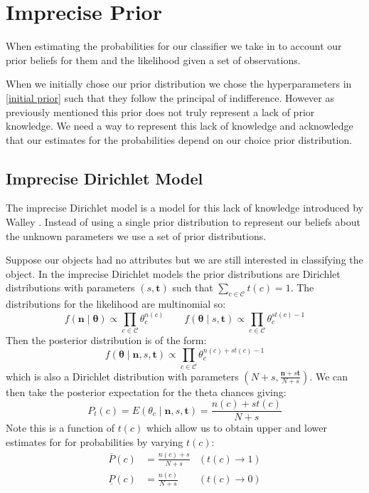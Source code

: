 \newcommand{\sn}[2]{\ensuremath{{#1}\times 10^{#2}}}

\chapter{Imprecise Prior}

When estimating the probabilities for our classifier we take in to account our prior beliefs for them and the likelihood given a set of observations.

When we initially chose our prior distribution we chose the hyperparameters in \cref{initial prior} such that they follow the principal of indifference.
However as previously mentioned this prior does not truly represent a lack of prior knowledge.
We need a way to represent this lack of knowledge and acknowledge that our estimates for the probabilities depend on our choice prior distribution.

\section{Imprecise Dirichlet Model}

The imprecise Dirichlet model is a model for this lack of knowledge introduced by Walley \cite{Walley96}.
Instead of using a single prior distribution to represent our beliefs about the unknown parameters we use a set of prior distributions.

Suppose our objects had no attributes but we are still interested in classifying the object.
In the imprecise Dirichlet models the prior distributions are Dirichlet distributions with parameters $(s, \mathbf{t})$ such that $\sum_{c \in \mathcal{C}} t(c) = 1$.
The distributions for the likelihood are multinomial so:
\begin{equation}
	f(\mathbf{n} \mid \mathbf{\theta}) \propto \prod_{c \in \mathcal{C}} \theta_c^{n(c)}
	\qquad
	f(\mathbf{\theta} \mid s, \mathbf{t}) \propto \prod_{c \in \mathcal{C}} \theta_c^{st(c) - 1}
\end{equation}
Then the posterior distribution is of the form:
\begin{equation} \label{dirichlet_pdf}
	f(\mathbf{\theta} \mid \mathbf{n}, s, \mathbf{t}) \propto \prod_{c \in \mathcal{C}} \theta_c^{n(c) + st(c) - 1}
\end{equation}
which is also a Dirichlet distribution with parameters $(N+s, \frac{\mathbf{n}+s\mathbf{t}}{N+s})$.
We can then take the posterior expectation for the theta chances giving:
\begin{equation}
	P_t(c) = E(\theta_c \mid \mathbf{n}, s, \mathbf{t}) = \frac{n(c)+st(c)}{N+s}
\end{equation}
Note this is a function of $t(c)$ which allow us to obtain upper and lower estimates for for probabilities by varying $t(c)$:
\begin{align}
	\overline{P}(c) & = \frac{n(c)+s}{N+s} & (t(c) \rightarrow 1) \\
	\underline{P}(c) & = \frac{n(c)}{N+s}  & (t(c) \rightarrow 0)
\end{align}

